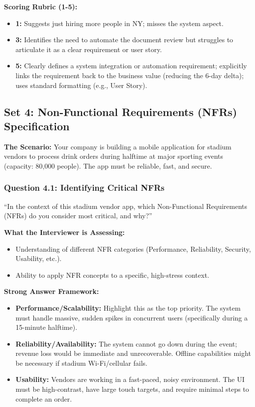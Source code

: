 \textbf{Scoring Rubric (1-5):}

\begin{itemize}
\tightlist
\item
  \textbf{1:} Suggests just hiring more people in NY; misses the system
  aspect.
\item
  \textbf{3:} Identifies the need to automate the document review but
  struggles to articulate it as a clear requirement or user story.
\item
  \textbf{5:} Clearly defines a system integration or automation
  requirement; explicitly links the requirement back to the business
  value (reducing the 6-day delta); uses standard formatting (e.g., User
  Story).
\end{itemize}

\bigskip

\subsection{Set 4: Non-Functional Requirements (NFRs)
Specification}\label{set-4-non-functional-requirements-nfrs-specification}

\textbf{The Scenario:} Your company is building a mobile application for
stadium vendors to process drink orders during halftime at major
sporting events (capacity: 80,000 people). The app must be reliable,
fast, and secure.

\subsubsection{Question 4.1: Identifying Critical
NFRs}\label{question-4.1-identifying-critical-nfrs}

``In the context of this stadium vendor app, which Non-Functional
Requirements (NFRs) do you consider most critical, and why?''

\textbf{What the Interviewer is Assessing:}

\begin{itemize}
\tightlist
\item
  Understanding of different NFR categories (Performance, Reliability,
  Security, Usability, etc.).
\item
  Ability to apply NFR concepts to a specific, high-stress context.
\end{itemize}

\textbf{Strong Answer Framework:}

\begin{itemize}
\tightlist
\item
  \textbf{Performance/Scalability:} Highlight this as the top priority.
  The system must handle massive, sudden spikes in concurrent users
  (specifically during a 15-minute halftime).
\item
  \textbf{Reliability/Availability:} The system cannot go down during
  the event; revenue loss would be immediate and unrecoverable. Offline
  capabilities might be necessary if stadium Wi-Fi/cellular fails.
\item
  \textbf{Usability:} Vendors are working in a fast-paced, noisy
  environment. The UI must be high-contrast, have large touch targets,
  and require minimal steps to complete an order.
\end{itemize}

